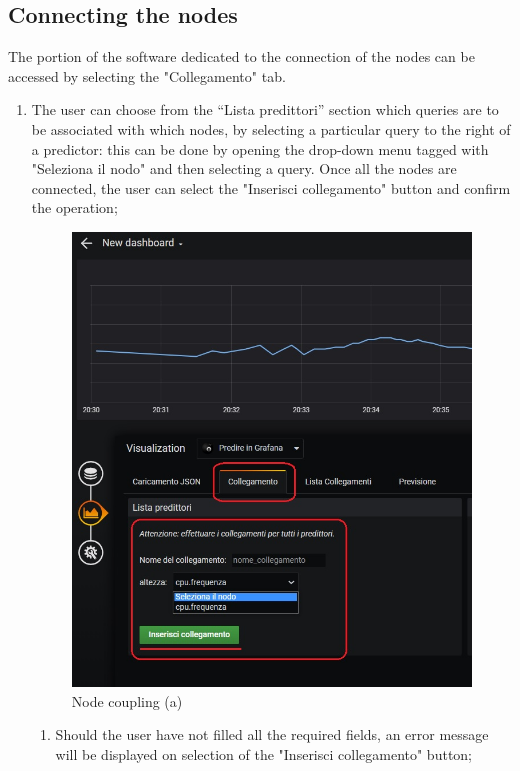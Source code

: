 \subsection{Connecting the nodes}
The portion of the software dedicated to the connection of the nodes can be accessed by selecting the "Collegamento" tab.
\begin{enumerate}
	\item The user can choose from the “Lista predittori” section which queries are to be associated with which nodes, by selecting a particular query to the right of a predictor: this can be done by opening the drop-down menu tagged with "Seleziona il nodo" and then selecting a query.
	Once all the nodes are connected, the user can select the "Inserisci collegamento" button and confirm the operation;
	
\begin{figure}[H]
\centering
\includegraphics[scale=0.75]{img/plug-in/insert_node.jpg}
\caption{Node coupling (a)}
\end{figure}



\begin{enumerate}
\item Should the user have not filled all the required fields, an error message will be displayed on selection of the "Inserisci collegamento" button;


\end{enumerate}
\end{enumerate}
